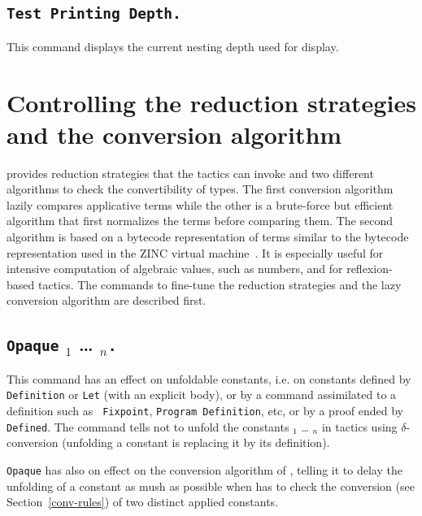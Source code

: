 \subsection[\tt Test Printing Depth.]{\tt Test Printing Depth.}
This command displays the current nesting depth used for display.


\section{Controlling the reduction strategies and the conversion algorithm}
\label{Controlling_reduction_strategy}

{\Coq} provides reduction strategies that the tactics can invoke and
two different algorithms to check the convertibility of types.
The first conversion algorithm lazily
compares applicative terms while the other is a brute-force but efficient
algorithm that first normalizes the terms before comparing them.  The
second algorithm is based on a bytecode representation of terms
similar to the bytecode representation used in the ZINC virtual
machine~\cite{Leroy90}. It is especially useful for intensive
computation of algebraic values, such as numbers, and for reflexion-based
tactics. The commands to fine-tune the reduction strategies and the
lazy conversion algorithm are described first.

\subsection[{\tt Opaque} \qualid$_1$ {\ldots} \qualid$_n${\tt .}]{{\tt Opaque} \qualid$_1$ {\ldots} \qualid$_n${\tt .}\label{Opaque}}
This command has an effect on unfoldable constants, i.e. 
on constants defined by {\tt Definition} or {\tt Let} (with an explicit
body), or by a command assimilated to a definition such as {\tt
Fixpoint}, {\tt Program Definition}, etc, or by a proof ended by {\tt
Defined}. The command tells not to unfold
the constants {\qualid$_1$} {\ldots} {\qualid$_n$} in tactics using
$\delta$-conversion (unfolding a constant is replacing it by its
definition).

{\tt Opaque} has also on effect on the conversion algorithm of {\Coq},
telling it to delay the unfolding of a constant as mush as possible when
{\Coq} has to check the conversion (see Section~\ref{conv-rules})
of two distinct applied constants.

